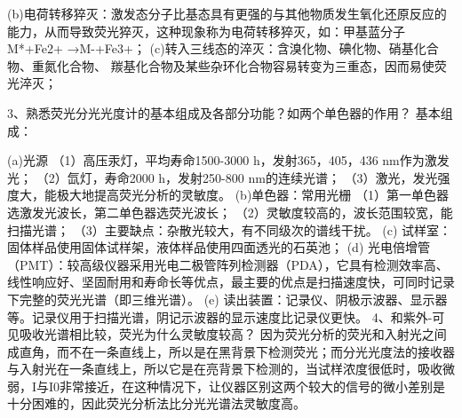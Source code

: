 (b)电荷转移猝灭：激发态分子比基态具有更强的与其他物质发生氧化还原反应的能力，从而导致荧光猝灭，这种现象称为电荷转移猝灭，如：甲基蓝分子M*+Fe2+ →M-+Fe3+；
(c)转入三线态的淬灭：含溴化物、碘化物、硝基化合物、重氮化合物、 羰基化合物及某些杂环化合物容易转变为三重态，因而易使荧光淬灭；

3、熟悉荧光分光光度计的基本组成及各部分功能？如两个单色器的作用？
基本组成： 

(a)光源
（1）高压汞灯，平均寿命1500-3000 h，发射365，405，436 nm作为激发光；
（2）氙灯，寿命2000 h，发射250-800 nm的连续光谱；
（3）激光，发光强度大，能极大地提高荧光分析的灵敏度。
(b)单色器：常用光栅
（1）第一单色器选激发光波长，第二单色器选荧光波长；
（2）灵敏度较高的，波长范围较宽，能扫描光谱；
（3）主要缺点：杂散光较大，有不同级次的谱线干扰。
(c) 试样室：固体样品使用固体试样架，液体样品使用四面透光的石英池；
(d) 光电倍增管（PMT）：较高级仪器采用光电二极管阵列检测器（PDA），它具有检测效率高、线性响应好、坚固耐用和寿命长等优点，最主要的优点是扫描速度快，可同时记录下完整的荧光光谱（即三维光谱）。
(e) 读出装置：记录仪、阴极示波器、显示器等。记录仪用于扫描光谱，阴记示波器的显示速度比记录仪更快。
4、和紫外-可见吸收光谱相比较，荧光为什么灵敏度较高？
因为荧光分析的荧光和入射光之间成直角，而不在一条直线上，所以是在黑背景下检测荧光；而分光光度法的接收器与入射光在一条直线上，所以它是在亮背景下检测的，当试样浓度很低时，吸收微弱，I与I0非常接近，在这种情况下，让仪器区别这两个较大的信号的微小差别是十分困难的，因此荧光分析法比分光光谱法灵敏度高。